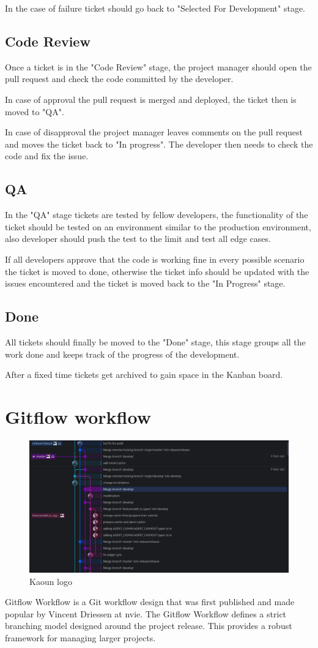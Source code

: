 \begin{spacing}{1.2}
In the case of failure ticket should go back to "Selected For Development" stage.
\subsection{Code Review}
Once a ticket is in the "Code Review" stage, the project manager should open the pull request and check the code committed by the developer.

In case of approval the pull request is merged and deployed, the ticket then is moved to "QA".


In case of disapproval the project manager leaves comments on the pull request and moves the ticket back to "In progress". The developer then needs to check the code and fix the issue.
\subsection{QA}
In the "QA" stage tickets are tested by fellow developers, the functionality of the ticket should be tested on an environment similar to the production environment, also developer should push the test to the limit and test all edge cases.

If all developers approve that the code is working fine in every possible scenario the ticket is moved to done, otherwise the ticket info should be updated with the issues encountered and the ticket is moved back to the "In Progress" stage.

\subsection{Done}
All tickets should finally be moved to the "Done" stage, this stage groups all the work done and keeps track of the progress of the development.


After a fixed time tickets get archived to gain space in the Kanban board.
\section{Gitflow workflow }
\begin{figure}[!ht]\centering
\includegraphics[scale=0.4]{git_workflow.png}
\caption{Kaoun logo}
\label{fig:fig1}
\end{figure}
Gitflow Workflow is a Git workflow design that was first published and made popular by Vincent Driessen at nvie. The Gitflow Workflow defines a strict branching model designed around the project release. This provides a robust framework for managing larger projects.


\end{spacing}
